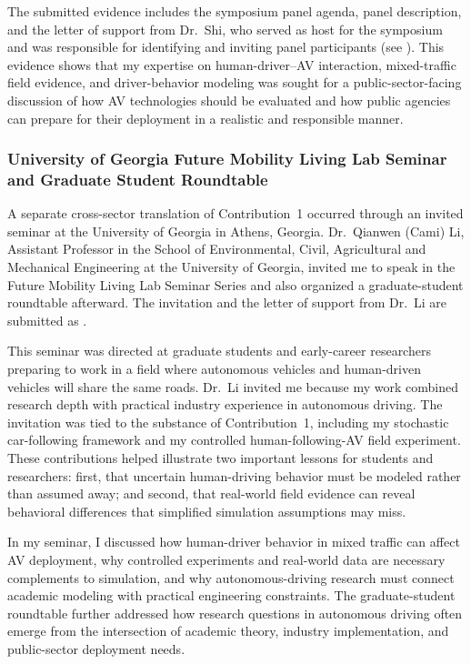 \documentclass[11pt,letterpaper]{article}
\begin{document}
The submitted evidence includes the symposium panel agenda, panel description, and the letter of support from Dr.~Shi, who served as host for the symposium and was responsible for identifying and inviting panel participants (see ). This evidence shows that my expertise on human-driver--AV interaction, mixed-traffic field evidence, and driver-behavior modeling was sought for a public-sector-facing discussion of how AV technologies should be evaluated and how public agencies can prepare for their deployment in a realistic and responsible manner.

\subsubsection{University of Georgia Future Mobility Living Lab Seminar and Graduate Student Roundtable}

A separate cross-sector translation of Contribution~1 occurred through an invited seminar at the University of Georgia in Athens, Georgia. Dr.~Qianwen (Cami) Li, Assistant Professor in the School of Environmental, Civil, Agricultural and Mechanical Engineering at the University of Georgia, invited me to speak in the Future Mobility Living Lab Seminar Series and also organized a graduate-student roundtable afterward. The invitation and the letter of support from Dr.~Li are submitted as .

This seminar was directed at graduate students and early-career researchers preparing to work in a field where autonomous vehicles and human-driven vehicles will share the same roads. Dr.~Li invited me because my work combined research depth with practical industry experience in autonomous driving. The invitation was tied to the substance of Contribution~1, including my stochastic car-following framework and my controlled human-following-AV field experiment. These contributions helped illustrate two important lessons for students and researchers: first, that uncertain human-driving behavior must be modeled rather than assumed away; and second, that real-world field evidence can reveal behavioral differences that simplified simulation assumptions may miss.

In my seminar, I discussed how human-driver behavior in mixed traffic can affect AV deployment, why controlled experiments and real-world data are necessary complements to simulation, and why autonomous-driving research must connect academic modeling with practical engineering constraints. The graduate-student roundtable further addressed how research questions in autonomous driving often emerge from the intersection of academic theory, industry implementation, and public-sector deployment needs.
\end{document}
